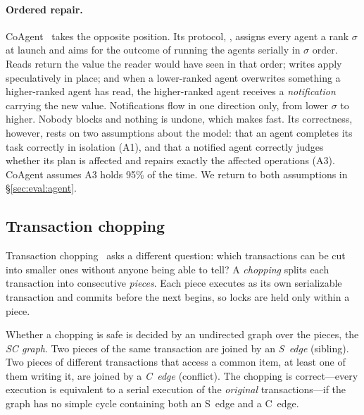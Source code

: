 \paragraph{Ordered repair.} CoAgent~\cite{lyu2026coagent} takes the opposite
position. Its protocol, \mtpo, assigns every agent a rank $\sigma$ at launch
and aims for the outcome of running the agents serially in $\sigma$ order.
Reads return the value the reader would have seen in that order; writes apply
speculatively in place; and when a lower-ranked agent overwrites something a
higher-ranked agent has read, the higher-ranked agent receives a
\emph{notification} carrying the new value. Notifications flow in one
direction only, from lower $\sigma$ to higher. Nobody blocks and nothing is
undone, which makes \mtpo fast. Its correctness, however, rests on two
assumptions about the model: that an agent completes its task correctly in
isolation (A1), and that a notified agent correctly judges whether its plan is
affected and repairs exactly the affected operations (A3). CoAgent assumes
A3 holds 95\% of the time. We return to both assumptions in
\S\ref{sec:eval:agent}.

\subsection{Transaction chopping}

Transaction chopping~\cite{shasha1995chopping} asks a different question:
which transactions can be cut into smaller ones without anyone being able to
tell? A \emph{chopping} splits each transaction into consecutive
\emph{pieces}. Each piece executes as its own serializable transaction and
commits before the next begins, so locks are held only within a piece.

Whether a chopping is safe is decided by an undirected graph over the pieces,
the \emph{SC graph}. Two pieces of the same transaction are joined by an
\emph{S~edge} (sibling). Two pieces of different transactions that access a
common item, at least one of them writing it, are joined by a \emph{C~edge}
(conflict). The chopping is correct---every execution is equivalent to a
serial execution of the \emph{original} transactions---if the graph has no
simple cycle containing both an S~edge and a C~edge.

